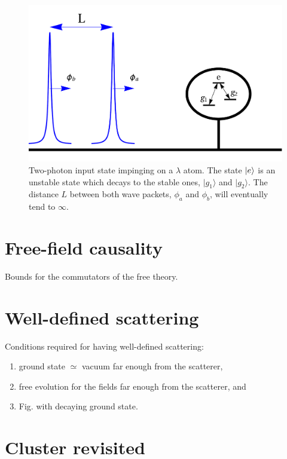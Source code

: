 \documentclass[notitlepage, prx, preprint, amsmath,superscriptaddress,amssymb]{revtex4-1}
\begin{document}
\begin{figure}
\includegraphics[scale=0.25]{input.pdf}
\caption{Two-photon input state impinging on a $\lambda$ atom. The state $\ket{e}$ is an unstable state which decays to the stable ones, $|g_1\rangle$ and $|g_2\rangle$. The distance $L$ between both wave packets, $\phi_a$ and $\phi_b$, will eventually tend to $\infty$.}
\label{fig:input}
\end{figure}


\section{Free-field causality}

{\color{blue}Bounds for the commutators of the free theory.}

\section{Well-defined scattering}

{\color{blue}Conditions required for having well-defined scattering:

\begin{enumerate}
\item ground state $\simeq$ vacuum far enough from the scatterer,
\item free evolution for the fields far enough from the scatterer, and
\item Fig. with decaying ground state.
\end{enumerate}
}

\section{Cluster revisited}
\end{document}

